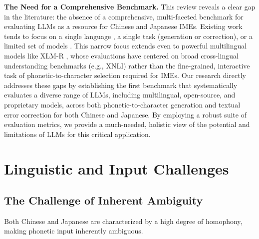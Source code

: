 \documentclass[10pt, a4paper]{article}
\begin{document}
\textbf{The Need for a Comprehensive Benchmark.}
This review reveals a clear gap in the literature: the absence of a comprehensive, multi-faceted benchmark for evaluating LLMs as a resource for Chinese and Japanese IMEs. Existing work tends to focus on a single language \citep{sun2021chinesebert, sawada2024release}, a single task (generation or correction), or a limited set of models \citep{suvarna2023phonologybench}. This narrow focus extends even to powerful multilingual models like XLM-R \citep{conneau-etal-2020-unsupervised}, whose evaluations have centered on broad cross-lingual understanding benchmarks (e.g., XNLI) rather than the fine-grained, interactive task of phonetic-to-character selection required for IMEs. Our research directly addresses these gaps by establishing the first benchmark that systematically evaluates a diverse range of LLMs, including multilingual, open-source, and proprietary models, across both phonetic-to-character generation and textual error correction for both Chinese and Japanese. By employing a robust suite of evaluation metrics, we provide a much-needed, holistic view of the potential and limitations of LLMs for this critical application.

\section{Linguistic and Input Challenges}


\subsection{The Challenge of Inherent Ambiguity}
Both Chinese and Japanese are characterized by a high degree of homophony, making phonetic input inherently ambiguous.
\end{document}
